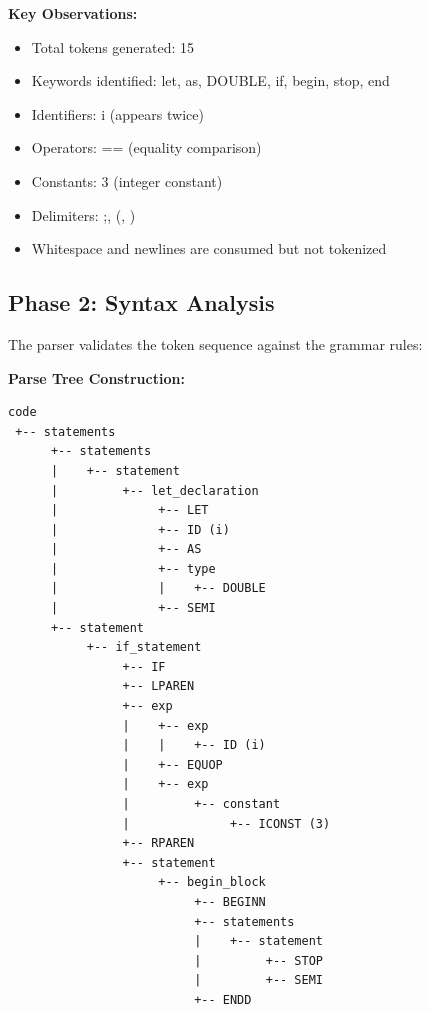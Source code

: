 \documentclass[12pt,a4paper]{article}
\begin{document}
\textbf{Key Observations:}
\begin{itemize}
    \item Total tokens generated: 15
    \item Keywords identified: let, as, DOUBLE, if, begin, stop, end
    \item Identifiers: i (appears twice)
    \item Operators: == (equality comparison)
    \item Constants: 3 (integer constant)
    \item Delimiters: ;, (, )
    \item Whitespace and newlines are consumed but not tokenized
\end{itemize}

\subsection{Phase 2: Syntax Analysis}

The parser validates the token sequence against the grammar rules:

\textbf{Parse Tree Construction:}
\begin{lstlisting}[caption={}, breaklines=false]
code
 +-- statements
      +-- statements
      |    +-- statement
      |         +-- let_declaration
      |              +-- LET
      |              +-- ID (i)
      |              +-- AS
      |              +-- type
      |              |    +-- DOUBLE
      |              +-- SEMI
      +-- statement
           +-- if_statement
                +-- IF
                +-- LPAREN
                +-- exp
                |    +-- exp
                |    |    +-- ID (i)
                |    +-- EQUOP
                |    +-- exp
                |         +-- constant
                |              +-- ICONST (3)
                +-- RPAREN
                +-- statement
                     +-- begin_block
                          +-- BEGINN
                          +-- statements
                          |    +-- statement
                          |         +-- STOP
                          |         +-- SEMI
                          +-- ENDD
\end{lstlisting}
\end{document}
